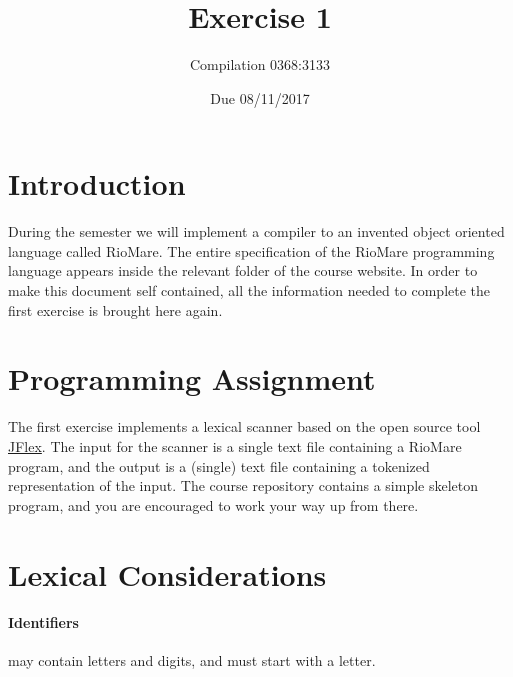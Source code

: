 \documentclass{article}
\begin{document}
\title{Exercise 1}

\author{Compilation 0368:3133}

\date{Due 08/11/2017}

\maketitle

\section{Introduction}
During the semester we will implement a compiler to an invented
object oriented language called RioMare.
The entire specification of the RioMare programming language
appears inside the relevant folder of the course website.
In order to make this document self contained,
all the information needed to complete the first exercise is brought here again.

\section{Programming Assignment}
The first exercise implements a lexical scanner based on the
open source tool \href{http://jflex.de/}{JFlex}.
The input for the scanner is a single text file containing a RioMare program,
and the output is a (single) text file containing a tokenized representation of the input.
The course repository contains a simple skeleton program,
and you are encouraged to work your way up from there.

\section{Lexical Considerations}
\paragraph{Identifiers} may contain letters and digits, and must start with a letter.
\end{document}
